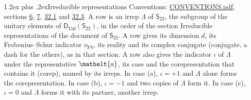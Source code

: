 \documentclass[10pt,a4paper]{article}
\makeatletter
\renewcommand\section{\@startsection{section}{1}{\z@}{-3ex plus -1ex minus -.2ex}%
  {1.2ex plus .2ex}{\normalfont\large\sffamily\bfseries\color{parttitle}}}
\numberwithin{equation}{section}
\newcommand{\eltfont}[1]{{\let\sigma\eltsigma\mathelt{#1}}}
\newcommand{\grp}[1]{\mathsf{#1}}
\newcommand{\elt}[1]{\eltfont{#1}}
\newcommand{\fsind}{\nu_{\mathrm{FS}}}
\makeatother
\begin{document}
\section{Irreducible representations}\label{s:irreps}
Conventions: \href{../../CONVENTIONS.pdf}{CONVENTIONS.pdf}, sections \href{../../../rotation/CONVENTIONS.pdf\#conv.6}{6}, \href{../../../rotation/CONVENTIONS.pdf\#conv.7}{7}, \href{../../CONVENTIONS.pdf\#conv.32.1}{32.1} and \href{../../CONVENTIONS.pdf\#conv.32.3}{32.3}.
\leavevmode\label{n:irrep.Delta}A row is an irrep $\Lambda$ of $\grp{S_{22}}$, the subgroup of the unitary elements of $\grp{D_{11d}}(\grp{S_{22}})$, in the order of the section Irreducible representations of the document of \href{../../../rotation/data/pdf/S22.pdf}{$\grp{S_{22}}$}. \label{n:index.dimension}\label{n:index.frobenius}\label{n:head.irrep}\label{n:head.reality}\label{n:head.conjugate}A row gives its dimension $d$, its Frobenius--Schur indicator $\fsind$, its reality and its complex conjugate (conjugate, a dash for the others), as in that section. \label{n:head.case.corep}\label{n:head.corep}A row also gives the indicator $\iota$ of $\Lambda$ under the representative $\elt{a}$, its case and the corepresentation that contains it (corep), named by its irreps. In case (a), $\iota = +1$ and $\Lambda$ alone forms the corepresentation. In case (b), $\iota = -1$ and two copies of $\Lambda$ form it. In case (c), $\iota = 0$ and $\Lambda$ forms it with its partner, another irrep.
\setlength{\emergencystretch}{2em}\par\setlength{\emergencystretch}{0pt}
\end{document}
